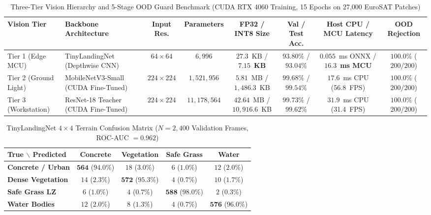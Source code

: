 \documentclass[conference]{IEEEtran}
\begin{document}
\begin{table}[t]
\centering
\caption{Three-Tier Vision Hierarchy and 5-Stage OOD Guard Benchmark (CUDA RTX 4060 Training, 15 Epochs on 27,000 EuroSAT Patches)}
\label{tab:vision_hierarchy}
\begin{tabular}{llcccccc}
\toprule
\textbf{Vision Tier} & \textbf{Backbone Architecture} & \textbf{Input Res.} & \textbf{Parameters} & \textbf{FP32 / INT8 Size} & \textbf{Val / Test Acc.} & \textbf{Host CPU / MCU Latency} & \textbf{OOD Rejection} \\
\midrule
Tier 1 (Edge MCU) & TinyLandingNet (Depthwise CNN) & $64 \times 64$ & $6,996$ & $27.3$~KB / $\mathbf{7.15}$~\textbf{KB} & $93.80\%$ / $93.04\%$ & $0.055$~ms ONNX / $\mathbf{16.3}$~\textbf{ms MCU} & $\mathbf{100.0\%}$ ($200/200$) \\
Tier 2 (Ground Light) & MobileNetV3-Small (CUDA Fine-Tuned) & $224 \times 224$ & $1,521,956$ & $5.81$~MB / $1,486.3$~KB & $99.68\%$ / $99.54\%$ & $17.6$~ms CPU (56.8~FPS) & $\mathbf{100.0\%}$ ($200/200$) \\
Tier 3 (Workstation) & ResNet-18 Teacher (CUDA Fine-Tuned) & $224 \times 224$ & $11,178,564$ & $42.64$~MB / $10,916.6$~KB & $\mathbf{99.73\%}$ / $\mathbf{99.62\%}$ & $31.9$~ms CPU (31.4~FPS) & $\mathbf{100.0\%}$ ($200/200$) \\
\bottomrule
\end{tabular}
\end{table}

\begin{table}[t]
\centering
\caption{TinyLandingNet $4 \times 4$ Terrain Confusion Matrix ($N = 2,400$ Validation Frames, ROC-AUC $= 0.962$)}
\label{tab:confusion_matrix}
\begin{tabular}{lcccc}
\toprule
\textbf{True $\backslash$ Predicted} & \textbf{Concrete} & \textbf{Vegetation} & \textbf{Safe Grass} & \textbf{Water} \\
\midrule
\textbf{Concrete / Urban} & $\mathbf{564}$ ($94.0\%$) & $18$ ($3.0\%$) & $6$ ($1.0\%$) & $12$ ($2.0\%$) \\
\textbf{Dense Vegetation} & $14$ ($2.3\%$) & $\mathbf{572}$ ($95.3\%$) & $4$ ($0.7\%$) & $10$ ($1.7\%$) \\
\textbf{Safe Grass LZ} & $6$ ($1.0\%$) & $4$ ($0.7\%$) & $\mathbf{588}$ ($98.0\%$) & $2$ ($0.3\%$) \\
\textbf{Water Bodies} & $12$ ($2.0\%$) & $8$ ($1.3\%$) & $4$ ($0.7\%$) & $\mathbf{576}$ ($96.0\%$) \\
\bottomrule
\end{tabular}
\end{table}
\end{document}
